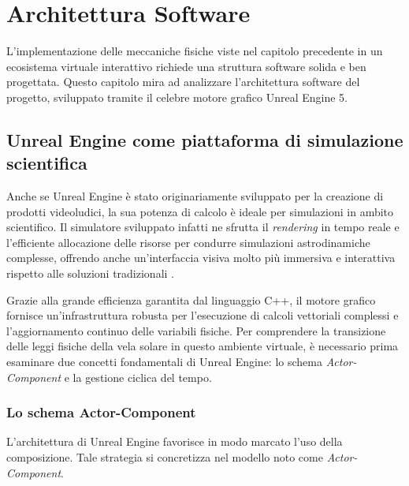 \chapter{Architettura Software}
\label{chap:architettura_software}

L'implementazione delle meccaniche fisiche viste nel capitolo precedente in un ecosistema virtuale interattivo richiede una struttura software solida e ben progettata.
Questo capitolo mira ad analizzare l'architettura software del progetto, sviluppato tramite il celebre motore grafico Unreal Engine 5.


\section{Unreal Engine come piattaforma di simulazione scientifica}

Anche se Unreal Engine è stato originariamente sviluppato per la creazione di prodotti videoludici, la sua potenza di calcolo è ideale per simulazioni in ambito scientifico. Il simulatore sviluppato infatti ne sfrutta il \textit{rendering} in tempo reale e l'efficiente allocazione delle risorse per condurre simulazioni astrodinamiche complesse, offrendo anche un'interfaccia visiva molto più immersiva e interattiva rispetto alle soluzioni tradizionali \cite{epicgames_unrealengine}.

Grazie alla grande efficienza garantita dal linguaggio C++, il motore grafico fornisce un'infrastruttura robusta per l'esecuzione di calcoli vettoriali complessi e l'aggiornamento continuo delle variabili fisiche. Per comprendere la transizione delle leggi fisiche della vela solare in questo ambiente virtuale, è necessario prima esaminare due concetti fondamentali di Unreal Engine: lo schema \textit{Actor-Component} e la gestione ciclica del tempo.


\subsection{Lo schema Actor-Component}

L'architettura di Unreal Engine favorisce in modo marcato l'uso della composizione. Tale strategia si concretizza nel modello noto come \textit{Actor-Component}.

